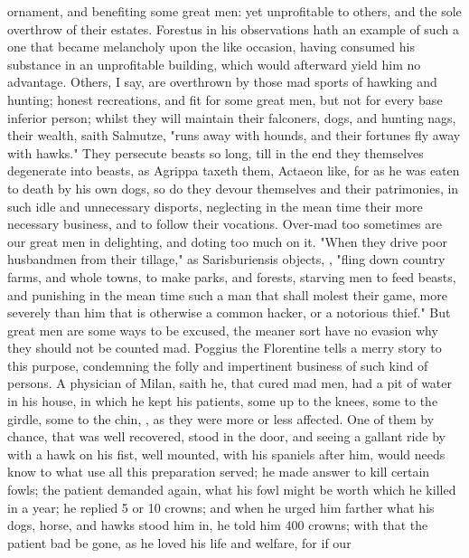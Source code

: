 ornament, and benefiting some great men: yet unprofitable to others, and the
sole overthrow of their estates. Forestus in his observations hath an example
of such a one that became melancholy upon the like occasion, having consumed
his substance in an unprofitable building, which would afterward yield him no
advantage. Others, I say, are overthrown by those mad
sports of hawking and hunting; honest recreations, and fit for some great men,
but not for every base inferior person; whilst they will maintain their
falconers, dogs, and hunting nags, their wealth, saith
Salmutze, "runs away with hounds, and their fortunes fly
away with hawks." They persecute beasts so long, till in the end they
themselves degenerate into beasts, as Agrippa taxeth them,
Actaeon like, for as he was eaten to death by his own
dogs, so do they devour themselves and their patrimonies, in such idle and
unnecessary disports, neglecting in the mean time their more necessary
business, and to follow their vocations. Over-mad too sometimes are our great
men in delighting, and doting too much on it. "When they
drive poor husbandmen from their tillage," as
Sarisburiensis objects, , "fling down country farms, and whole towns, to make parks, and
forests, starving men to feed beasts, and punishing in the
mean time such a man that shall molest their game, more severely than him that
is otherwise a common hacker, or a notorious thief." But great men are some
ways to be excused, the meaner sort have no evasion why they should not be
counted mad. Poggius the Florentine tells a merry story to this purpose,
condemning the folly and impertinent business of such kind of persons. A
physician of Milan, saith he, that cured mad men, had a pit of water in his
house, in which he kept his patients, some up to the knees, some to the girdle,
some to the chin, , as they were more or less affected.
One of them by chance, that was well recovered, stood in the door, and seeing a
gallant ride by with a hawk on his fist, well mounted, with his spaniels after
him, would needs know to what use all this preparation served; he made answer
to kill certain fowls; the patient demanded again, what his fowl might be worth
which he killed in a year; he replied 5 or 10 crowns; and when he urged him
farther what his dogs, horse, and hawks stood him in, he told him 400 crowns;
with that the patient bad be gone, as he loved his life and welfare, for if our
